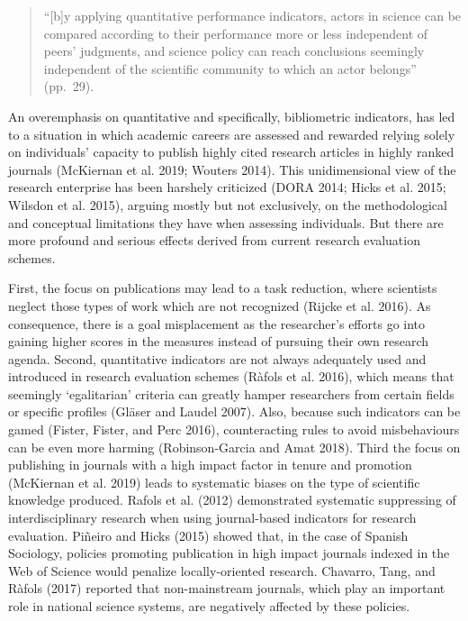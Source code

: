 \documentclass[]{elsarticle} %
\begin{document}
\begin{quote}
``{[}b{]}y applying quantitative performance indicators, actors in
science can be compared according to their performance more or less
independent of peers' judgments, and science policy can reach
conclusions seemingly independent of the scientific community to which
an actor belongs'' (pp.~29).
\end{quote}

An overemphasis on quantitative and specifically, bibliometric
indicators, has led to a situation in which academic careers are
assessed and rewarded relying solely on individuals' capacity to publish
highly cited research articles in highly ranked journals (McKiernan et
al. 2019; Wouters 2014). This unidimensional view of the research
enterprise has been harshely criticized (DORA 2014; Hicks et al. 2015;
Wilsdon et al. 2015), arguing mostly but not exclusively, on the
methodological and conceptual limitations they have when assessing
individuals. But there are more profound and serious effects derived
from current research evaluation schemes.

First, the focus on publications may lead to a task reduction, where
scientists neglect those types of work which are not recognized (Rijcke
et al. 2016). As consequence, there is a goal misplacement as the
researcher's efforts go into gaining higher scores in the measures
instead of pursuing their own research agenda. Second, quantitative
indicators are not always adequately used and introduced in research
evaluation schemes (Ràfols et al. 2016), which means that seemingly
`egalitarian' criteria can greatly hamper researchers from certain
fields or specific profiles (Gläser and Laudel 2007). Also, because such
indicators can be gamed (Fister, Fister, and Perc 2016), counteracting
rules to avoid misbehaviours can be even more harming (Robinson-Garcia
and Amat 2018). Third the focus on publishing in journals with a high
impact factor in tenure and promotion (McKiernan et al. 2019) leads to
systematic biases on the type of scientific knowledge produced. Rafols
et al. (2012) demonstrated systematic suppressing of interdisciplinary
research when using journal-based indicators for research evaluation.
Piñeiro and Hicks (2015) showed that, in the case of Spanish Sociology,
policies promoting publication in high impact journals indexed in the
Web of Science would penalize locally-oriented research. Chavarro, Tang,
and Ràfols (2017) reported that non-mainstream journals, which play an
important role in national science systems, are negatively affected by
these policies.
\end{document}
